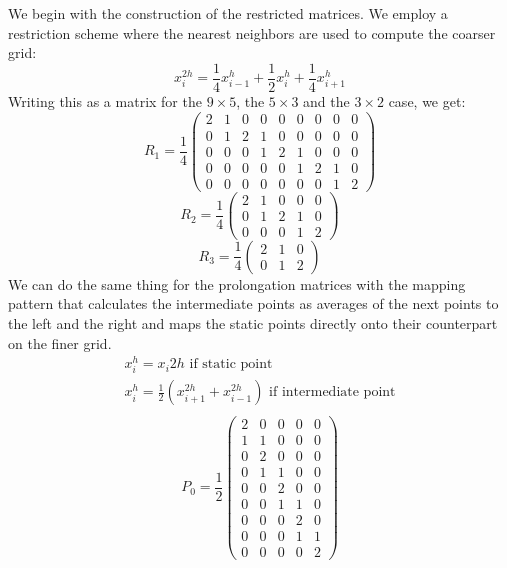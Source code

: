 \documentclass{scrartcl}
\begin{document}
We begin with the construction of the restricted matrices. We employ a restriction scheme where the nearest neighbors are used to compute the coarser grid:
\begin{equation}
	x^{2h}_i = \frac{1}{4} x^{h}_{i-1} + \frac{1}{2} x^{h}_{i} + \frac{1}{4} x^{h}_{i+1}
\end{equation}
Writing this as a matrix for the \( 9 \times 5 \), the \( 5 \times 3\) and the \( 3 \times 2 \) case, we get:
\begin{equation}
	R_1 = \dfrac{1}{4}\begin{pmatrix}
	2&1&0&0&0&0&0&0&0\\
	0&1&2&1&0&0&0&0&0\\
	0&0&0&1&2&1&0&0&0\\
	0&0&0&0&0&1&2&1&0\\
	0&0&0&0&0&0&0&1&2
	\end{pmatrix}
\end{equation}
\begin{equation}
	R_2 = \dfrac{1}{4}\begin{pmatrix}
	2&1&0&0&0\\
	0&1&2&1&0\\
	0&0&0&1&2
	\end{pmatrix}
\end{equation}
\begin{equation}
	R_3 = \dfrac{1}{4}\begin{pmatrix}
	2&1&0\\
	0&1&2
	\end{pmatrix}
\end{equation}
We can do the same thing for the prolongation matrices with the mapping pattern that calculates the intermediate points as averages of the next points to the left and the right and maps the static points directly onto their counterpart on the finer grid.
\begin{align*}
	x_i^{h} = x_i{2h} \text{  if static point}\\
	x_i^{h} = \frac{1}{2}(x_{i+1}^{2h} + x_{i-1}^{2h})  \text{  if intermediate point}\\
\end{align*}
\begin{equation}
	P_0 = \dfrac{1}{2}\begin{pmatrix}
	2&0&0&0&0\\
	1&1&0&0&0\\
	0&2&0&0&0\\
	0&1&1&0&0\\
	0&0&2&0&0\\
	0&0&1&1&0\\
	0&0&0&2&0\\
	0&0&0&1&1\\
	0&0&0&0&2
	\end{pmatrix}
\end{equation}
\end{document}
